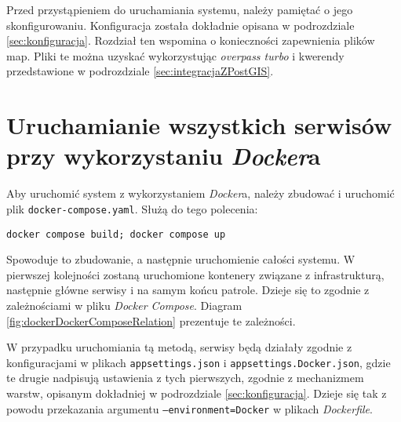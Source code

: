 \par Przed przystąpieniem do uruchamiania systemu, należy pamiętać o jego skonfigurowaniu. Konfiguracja została dokładnie opisana w podrozdziale \ref{sec:konfiguracja}. Rozdział ten wspomina o konieczności zapewnienia plików map. Pliki te można uzyskać wykorzystując \emph{overpass turbo}\cite{OVERPASS_TURBO_SITE} i kwerendy przedstawione w podrozdziale \ref{sec:integracjaZPostGIS}.

\section{Uruchamianie wszystkich serwisów przy wykorzystaniu \emph{Docker}a}

\par Aby uruchomić system z wykorzystaniem \emph{Docker}a, należy zbudować i uruchomić plik \texttt{docker-compose.yaml}. Służą do tego polecenia:
\begin{verbatim}
docker compose build; docker compose up
\end{verbatim}
Spowoduje to zbudowanie, a następnie uruchomienie całości systemu. W pierwszej kolejności zostaną uruchomione kontenery związane z infrastrukturą, następnie główne serwisy i na samym końcu patrole. Dzieje się to zgodnie z zależnościami w pliku \emph{Docker Compose}. Diagram \ref{fig:dockerDockerComposeRelation} prezentuje te zależności.

\par W przypadku uruchomiania tą metodą, serwisy będą działały zgodnie z konfiguracjami w plikach \texttt{appsettings.json} i \texttt{appsettings.Docker.json}, gdzie te drugie nadpisują ustawienia z tych pierwszych, zgodnie z mechanizmem warstw, opisanym dokładniej w podrozdziale \ref{sec:konfiguracja}. Dzieje się tak z powodu przekazania argumentu \texttt{--environment=Docker} w plikach \emph{Dockerfile}.

